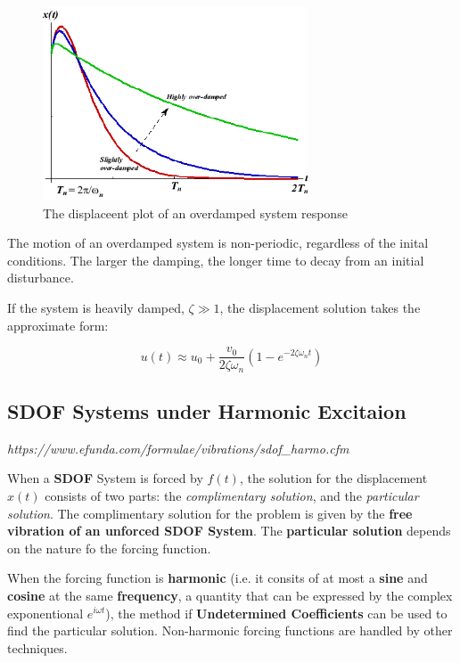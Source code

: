 \documentclass[10pt,b5paper,titlepage]{book}
\begin{document}
\begin{figure}[ht]
    \centering
    \includegraphics[width=0.70\textwidth]{img/SDOF_OverDamped_Response.png}
    \caption{The displaceent plot of an overdamped system response}
    \label{fig:SDOF-overdamped-response-png}
\end{figure}

The motion of an overdamped system is non-periodic, regardless of the inital conditions.
The larger the damping, the longer time to decay from an initial disturbance.

If the system is heavily damped, $ \zeta \gg 1 $, the displacement solution takes
the approximate form:

\begin{equation}
    u(t) \approx u_0 + \frac{v_0}{2 \zeta \omega_n}
    \left(1 - e^{-2 \zeta \omega_n t} \right)
\end{equation}


\subsection{SDOF Systems under Harmonic Excitaion}
\textit{https://www.efunda.com/formulae/vibrations/sdof\_harmo.cfm}

When a \textbf{SDOF} System is forced by $ f(t) $, the solution for the displacement
$ x(t) $ consists of two parts: the \textit{complimentary solution}, and the
\textit{particular solution}. The complimentary solution for the problem
is given by the \textbf{free vibration of an unforced SDOF System}.
The \textbf{particular solution} depends on the nature fo the forcing function.

When the forcing function is \textbf{harmonic} (i.e. it consits of at most
a \textbf{sine} and \textbf{cosine} at the same \textbf{frequency},
a quantity that can be expressed by the complex exponentional $ e^{i \omega t} $),
the method if \textbf{Undetermined Coefficients} can be used to find the particular
solution. Non-harmonic forcing functions are handled by other techniques.
\end{document}
